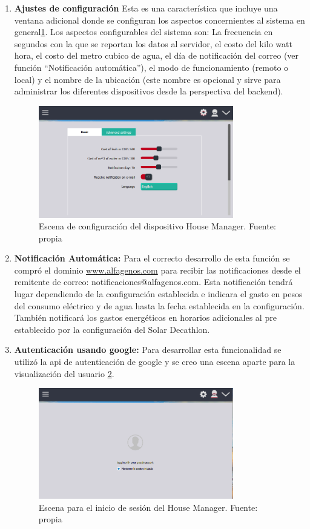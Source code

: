 \begin{enumerate}
	\item \textbf{Ajustes de configuración} Esta es una característica que incluye una ventana adicional donde se configuran los aspectos concernientes al sistema en general\ref{fig_10}. Los aspectos configurables del sistema son: La frecuencia en segundos con la que se reportan los datos al servidor, el costo del kilo watt hora, el costo del metro cubico de agua, el día de notificación del correo (ver función ``Notificación automática''), el modo de funcionamiento (remoto o local) y el nombre de la ubicación (este nombre es opcional y sirve para administrar los diferentes dispositivos desde la perspectiva del backend).
	\begin{figure}[htbp]
		\centerline{\includegraphics[width=8.5cm]{figuras/housemanager_config.png}}
		\caption{Escena de configuración del dispositivo House Manager. Fuente: propia}
		\label{fig_10}
	\end{figure}

	\item \textbf{Notificación Automática:} Para el correcto desarrollo de esta función se compró el dominio \href{www.alfagenos.com}{www.alfagenos.com} para recibir las notificaciones desde el remitente de correo: notificaciones@alfagenos.com. Esta notificación tendrá lugar dependiendo de la configuración establecida e indicara el gasto en pesos del consumo eléctrico y de agua hasta la fecha establecida en la configuración. También notificará los gastos  energéticos en horarios adicionales al pre establecido por la configuración del Solar Decathlon.
	
	\item\textbf{Autenticación usando google:} Para desarrollar esta funcionalidad se utilizó la api de autenticación de google y se creo una escena aparte para la visualización del usuario \ref{fig_11}.
	\begin{figure}[htbp]
		\centerline{\includegraphics[width=8.5cm]{figuras/housemanager_user.png}}
		\caption{Escena para el inicio de sesión del House Manager. Fuente: propia}
		\label{fig_11}
	\end{figure}
	

\end{enumerate}
